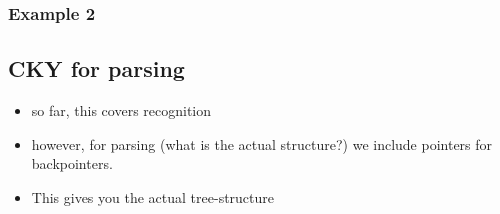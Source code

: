 \documentclass[11pt]{article}
\begin{document}
\subsubsection{Example 2}

\begin{figure}[H]
    \centering
\end{figure}

\subsection{CKY for parsing}

\begin{minipage}[l]{.5\linewidth}
    \begin{figure}[H]
        \centering
    \end{figure}    
\end{minipage}\hfill
\begin{minipage}[r]{.48\linewidth}
    \begin{itemize}
        \item so far, this covers recognition
        \item however, for parsing (what is the actual structure?) we include pointers for backpointers.
        \item This gives you the actual tree-structure
    \end{itemize}
\end{minipage}
\end{document}
